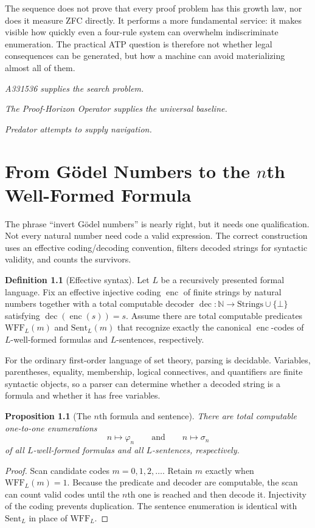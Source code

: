 \documentclass[11pt,oneside]{book}
\newtheorem{proposition}[theorem]{Proposition}
\theoremstyle{definition}
\newtheorem{definition}[theorem]{Definition}
\theoremstyle{remark}
\newcommand{\N}{\mathbb{N}}
\newcommand{\enc}{\operatorname{enc}}
\newcommand{\decod}{\operatorname{dec}}
\begin{document}
The sequence does not prove that every proof problem has this growth law, nor does it measure ZFC directly. It performs a more fundamental service: it makes visible how quickly even a four-rule system can overwhelm indiscriminate enumeration. The practical ATP question is therefore not whether legal consequences can be generated, but how a machine can avoid materializing almost all of them.

\begin{center}
\emph{A331536 supplies the search problem.}\par
\emph{The Proof-Horizon Operator supplies the universal baseline.}\par
\emph{Predator attempts to supply navigation.}
\end{center}

\chapter{From G\"odel Numbers to the $n$th Well-Formed Formula}
The phrase ``invert G\"odel numbers'' is nearly right, but it needs one qualification. Not every natural number need code a valid expression. The correct construction uses an effective coding/decoding convention, filters decoded strings for syntactic validity, and counts the survivors.

\begin{definition}[Effective syntax]\label{def:syntax}
Let $L$ be a recursively presented formal language. Fix an effective injective coding $\enc$ of finite strings by natural numbers together with a total computable decoder $\decod:\N\to \text{Strings}\cup\{\bot\}$ satisfying $\decod(\enc(s))=s$. Assume there are total computable predicates $\mathrm{WFF}_L(m)$ and $\mathrm{Sent}_L(m)$ that recognize exactly the canonical $\enc$-codes of $L$-well-formed formulas and $L$-sentences, respectively.
\end{definition}

For the ordinary first-order language of set theory, parsing is decidable. Variables, parentheses, equality, membership, logical connectives, and quantifiers are finite syntactic objects, so a parser can determine whether a decoded string is a formula and whether it has free variables.

\begin{proposition}[The $n$th formula and sentence]\label{prop:nth}
There are total computable one-to-one enumerations
\[
n\longmapsto \varphi_n
\qquad\text{and}\qquad
n\longmapsto \sigma_n
\]
of all $L$-well-formed formulas and all $L$-sentences, respectively.
\end{proposition}
\begin{proof}
Scan candidate codes $m=0,1,2,\ldots$. Retain $m$ exactly when $\mathrm{WFF}_L(m)=1$. Because the predicate and decoder are computable, the scan can count valid codes until the $n$th one is reached and then decode it. Injectivity of the coding prevents duplication. The sentence enumeration is identical with $\mathrm{Sent}_L$ in place of $\mathrm{WFF}_L$.
\end{proof}
\end{document}
